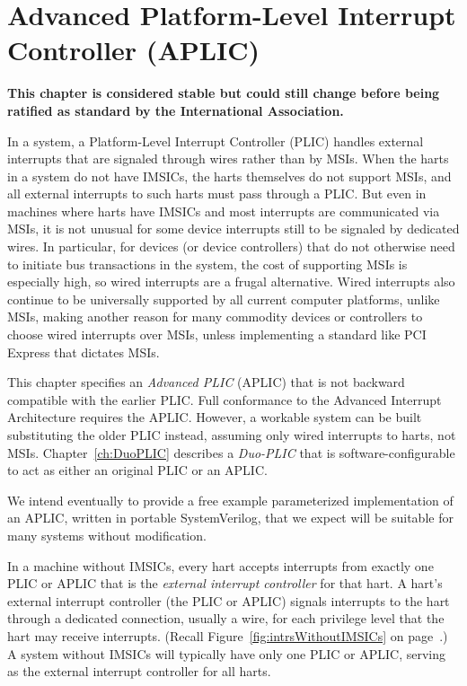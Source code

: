 
\chapter{Advanced Platform-Level Interrupt Controller (APLIC)}
\label{ch:AdvPLIC}

\textbf{%
This chapter is considered stable but could still change before being
ratified as standard by the {\RISCV} International Association.%
}
\bigskip

In a {\RISCV} system, a Platform-Level Interrupt Controller (PLIC)
handles external interrupts that are signaled through wires rather than
by MSIs.
When the {\RISCV} harts in a system do not have IMSICs, the harts
themselves do not support MSIs, and all external interrupts to such
harts must pass through a PLIC.
But even in machines where harts have IMSICs and most interrupts are
communicated via MSIs, it is not unusual for some device interrupts
still to be signaled by dedicated wires.
In particular, for devices (or device controllers) that do not
otherwise need to initiate bus transactions
in the system, the cost of supporting
MSIs is especially high, so wired interrupts are a frugal alternative.
Wired interrupts also continue to be universally supported by all
current computer platforms, unlike MSIs, making another reason for many
commodity devices or controllers to choose wired interrupts over MSIs,
unless implementing a standard like PCI Express that dictates MSIs.

This chapter specifies an \emph{Advanced PLIC} (APLIC) that is not backward
compatible with the earlier {\RISCV} PLIC.
Full conformance to the Advanced Interrupt Architecture requires the
APLIC.
However, a workable system can be built substituting the older PLIC
instead, assuming only wired interrupts to harts, not MSIs.
Chapter~\ref{ch:DuoPLIC} describes a \emph{\mbox{Duo-PLIC\/}} that is
software-configurable to act as either an original {\RISCV} PLIC or an
APLIC.

\begin{commentary}
We intend eventually to provide a free example parameterized
implementation of an APLIC, written in portable SystemVerilog,
that we expect will be suitable for many {\RISCV} systems without
modification.
\end{commentary}

In a machine without IMSICs, every {\RISCV} hart accepts interrupts
from exactly one PLIC or APLIC that is the \emph{external interrupt controller}
for that hart.
A hart's external interrupt controller (the PLIC or APLIC) signals interrupts
to the hart through a dedicated connection, usually a wire, for each
privilege level that the hart may receive interrupts.
(Recall Figure~\ref{fig:intrsWithoutIMSICs} on
page~\pageref{fig:intrsWithoutIMSICs}.)
A system without IMSICs will typically have only one PLIC or APLIC, serving as
the external interrupt controller for all {\RISCV} harts.

